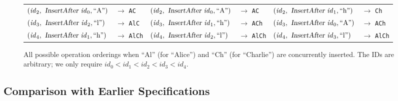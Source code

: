\begin{figure}
\begin{tabular}{ll|ll|ll}
$(\mathit{id}_2, \isa{InsertAfter } \mathit{id}_0, \text{``A''})$ & $\rightarrow$ \texttt{AC} &
$(\mathit{id}_2, \isa{InsertAfter } \mathit{id}_0, \text{``A''})$ & $\rightarrow$ \texttt{AC} &
$(\mathit{id}_2, \isa{InsertAfter } \mathit{id}_1, \text{``h''})$ & $\rightarrow$ \texttt{Ch} \\
$(\mathit{id}_3, \isa{InsertAfter } \mathit{id}_2, \text{``l''})$ & $\rightarrow$ \texttt{AlC} &
$(\mathit{id}_3, \isa{InsertAfter } \mathit{id}_1, \text{``h''})$ & $\rightarrow$ \texttt{ACh} &
$(\mathit{id}_3, \isa{InsertAfter } \mathit{id}_0, \text{``A''})$ & $\rightarrow$ \texttt{ACh} \\
$(\mathit{id}_4, \isa{InsertAfter } \mathit{id}_1, \text{``h''})$ & $\rightarrow$ \texttt{AlCh} &
$(\mathit{id}_4, \isa{InsertAfter } \mathit{id}_2, \text{``l''})$ & $\rightarrow$ \texttt{AlCh} &
$(\mathit{id}_4, \isa{InsertAfter } \mathit{id}_3, \text{``l''})$ & $\rightarrow$ \texttt{AlCh} \\
\end{tabular}
\caption{All possible operation orderings when ``Al'' (for ``Alice'') and ``Ch'' (for ``Charlie'') are concurrently inserted.
The IDs are arbitrary; we only require $id_0 < id_1 < id_2 < id_3 < id_4$.}\label{fig:op-permutations}
\end{figure}

\subsection{Comparison with Earlier Specifications}

